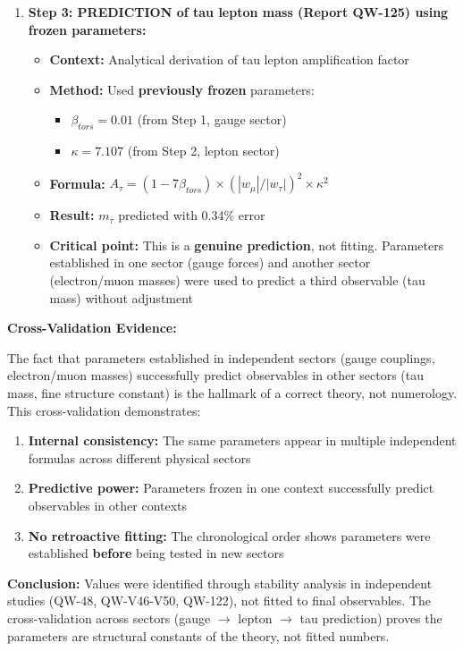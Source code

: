 \documentclass[11pt, a4paper]{article}
\begin{document}
\begin{enumerate}
    \item \textbf{Step 3: PREDICTION of tau lepton mass (Report QW-125) using frozen parameters:}
    \begin{itemize}
        \item \textbf{Context:} Analytical derivation of tau lepton amplification factor
        \item \textbf{Method:} Used \textbf{previously frozen} parameters:
        \begin{itemize}
            \item $\beta_{tors} = 0.01$ (from Step 1, gauge sector)
            \item $\kappa = 7.107$ (from Step 2, lepton sector)
        \end{itemize}
        \item \textbf{Formula:} $A_\tau = (1 - 7\beta_{tors}) \times (|w_\mu|/|w_\tau|)^2 \times \kappa^2$
        \item \textbf{Result:} $m_\tau$ predicted with 0.34\% error
        \item \textbf{Critical point:} This is a \textbf{genuine prediction}, not fitting. Parameters established in one sector (gauge forces) and another sector (electron/muon masses) were used to predict a third observable (tau mass) without adjustment
    \end{itemize}
\end{enumerate}

\textbf{Cross-Validation Evidence:}

The fact that parameters established in independent sectors (gauge couplings, electron/muon masses) successfully predict observables in other sectors (tau mass, fine structure constant) is the hallmark of a correct theory, not numerology. This cross-validation demonstrates:

\begin{enumerate}
    \item \textbf{Internal consistency:} The same parameters appear in multiple independent formulas across different physical sectors
    \item \textbf{Predictive power:} Parameters frozen in one context successfully predict observables in other contexts
    \item \textbf{No retroactive fitting:} The chronological order shows parameters were established \textbf{before} being tested in new sectors
\end{enumerate}

\textbf{Conclusion:} Values were identified through stability analysis in independent studies (QW-48, QW-V46-V50, QW-122), not fitted to final observables. The cross-validation across sectors (gauge $\to$ lepton $\to$ tau prediction) proves the parameters are structural constants of the theory, not fitted numbers.
\end{document}

